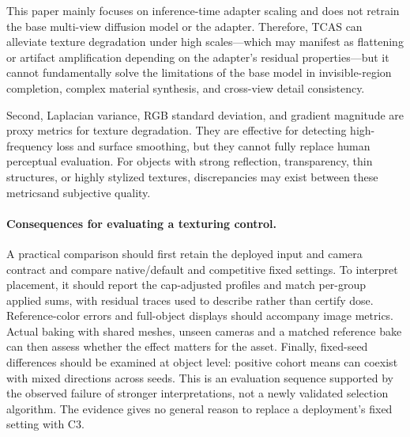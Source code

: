 \documentclass[times,twocolumn,final]{elsarticle}
\providecommand{\DIFadd}[1]{{\protect\color{blue} \sf #1}} %
\providecommand{\DIFdel}[1]{{\protect\color{red} \scriptsize #1}} %
\providecommand{\DIFaddbegin}{} %
\providecommand{\DIFaddend}{} %
\providecommand{\DIFdelend}{} %
\begin{document}

\DIFdel{This paper mainly focuses on inference-time adapter scaling and does not retrain the base multi-view diffusion model or the adapter. Therefore, TCAS can alleviate texture degradation under high scales---which may manifest as flattening or artifact amplification depending on the adapter's residual properties---but it cannot fundamentally solve the limitations of the base model in invisible-region completion, complex material synthesis, and cross-view detail consistency.
}%

\DIFdel{Second, Laplacian variance, RGB standard deviation, and gradient magnitude are proxy metrics for texture degradation. They are effective for detecting high-frequency loss and surface smoothing, but they cannot fully replace human perceptual evaluation. For objects with strong reflection, transparency, thin structures, or highly stylized textures, discrepancies may exist between these metricsand subjective quality. }\DIFdelend \DIFaddbegin \paragraph{Consequences for evaluating a texturing control.}
\DIFadd{A practical comparison should first retain the deployed input and camera contract and compare native/default and competitive fixed settings. To interpret placement, it should report the cap-adjusted profiles and match per-group applied sums, with residual traces used to describe rather than certify dose. Reference-color errors and full-object displays should accompany image metrics. Actual baking with shared meshes, unseen cameras and a matched reference bake can then assess whether the effect matters for the asset. Finally, fixed-seed differences should be examined at object level: positive cohort means can coexist with mixed directions across seeds. This is an evaluation sequence supported by the observed failure of stronger interpretations, not a newly validated selection algorithm. The evidence gives no general reason to replace a deployment's fixed setting with C3.
}\DIFaddend 
\end{document}
